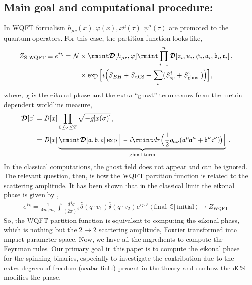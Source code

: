 \subsection*{Main goal and computational procedure:}
In WQFT formalism $h_{\mu\nu}(x),\varphi(x),x^\mu(\tau),\psi^\mu(\tau)$ are promoted to the quantum operators. For this case, the partition function looks like,
\begin{align}
    \begin{split}
        Z_{\textrm{S-WQFT}}\equiv e^{i\chi}=\mathcal{N}&\times\rmint \boldsymbol{\mathcal{D}}[h_{\mu\nu},\varphi]\rmint \prod_{i=1}^n \boldsymbol{\mathcal{D}}[z_i,\psi_i,\bar{\psi}_i,\mathfrak{a}_i,\mathfrak{b}_i,\mathfrak{c}_i]\,,\\ &
        \times \exp\Big[i\Big(S_{EH}+S_{\textrm{dCS}}+\sum_i (S_{\textrm{sp}}^{i}+S^{i}_{\textrm{ghost}})\Big)\Big],
    \end{split}
\end{align}
where, $\chi$ is the eikonal phase and the extra ``ghost'' term comes from the metric dependent worldline measure,
\begin{align}
    \begin{split}
       \boldsymbol{ \mathcal{D}}[x]&=D[x]\prod_{0\le \sigma\le T}\sqrt{-g[x(\sigma)]}\,,\\ &
        =D[x]\underbrace{\rmint \boldsymbol{\mathcal{D}}[\mathfrak{a},\mathfrak{b},\mathfrak{c}]\exp \Big[-i\rmint d\tau\Big(\frac{1}{2}g_{\mu\nu}(\mathfrak{a}^\mu\mathfrak{a}^\mu+\mathfrak{b}^\nu\mathfrak{c}^\nu)\big)\Big]}_{\textrm{ghost term}}\,.
    \end{split}
\end{align}
In the classical computations, the ghost field does not appear and can be ignored. The relevant question, then, is how the WQFT partition function is related to the scattering amplitude. It has been shown that in the classical limit the eikonal phase is given by \cite{Amati:1987wq,Amati:1990xe},
\begin{align}
    e^{i\chi}=\frac{1}{4m_1 m_2}\int  \frac{d^4 q}{(2\pi)^4} \, \hat\delta(q\cdot v_1)\hat\delta(q\cdot v_2) e^{iq\cdot b}\,\langle \,\textrm{final}\,|\mathbb{S}|\,\textrm{initial}\,\rangle\xrightarrow[]{} Z_{\textrm{WQFT}}\label{2.18a}
\end{align}
So, the WQFT partition function is equivalent to computing the eikonal phase, which is nothing but the $2\to2$ scattering amplitude, Fourier transformed into impact parameter space.
Now, we have all the ingredients to compute the Feynman rules. Our primary goal in this paper is to compute the eikonal phase for the spinning binaries, especially to investigate the contribution due to the extra degrees of freedom (scalar field) present in the theory and see how the dCS modifies the phase. 
